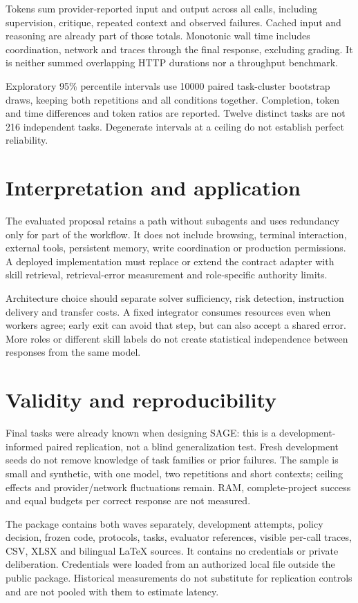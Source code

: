 \documentclass[11pt,a4paper]{article}
\begin{document}
Tokens sum provider-reported input and output across all calls, including
supervision, critique, repeated context and observed failures. Cached input and
reasoning are already part of those totals. Monotonic wall time includes
coordination, network and traces through the final response, excluding grading.
It is neither summed overlapping HTTP durations nor a throughput benchmark.

Exploratory 95\% percentile intervals use 10000 paired task-cluster bootstrap
draws, keeping both repetitions and all conditions together. Completion, token
and time differences and token ratios are reported. Twelve distinct tasks are
not 216 independent tasks. Degenerate intervals at a ceiling do not establish
perfect reliability.


\section{Interpretation and application}

The evaluated proposal retains a path without subagents and uses redundancy only
for part of the workflow. It does not include browsing, terminal interaction,
external tools, persistent memory, write coordination or production permissions.
A deployed implementation must replace or extend the contract adapter with skill
retrieval, retrieval-error measurement and role-specific authority limits.

Architecture choice should separate solver sufficiency, risk detection,
instruction delivery and transfer costs. A fixed integrator consumes resources
even when workers agree; early exit can avoid that step, but can also accept a
shared error. More roles or different skill labels do not create statistical
independence between responses from the same model.

\section{Validity and reproducibility}
Final tasks were already known when designing SAGE: this is a development-informed
paired replication, not a blind generalization test. Fresh development seeds do
not remove knowledge of task families or prior failures. The sample is small and
synthetic, with one model, two repetitions and short contexts; ceiling effects
and provider/network fluctuations remain. RAM, complete-project success and
equal budgets per correct response are not measured.

The package contains both waves separately, development attempts, policy decision,
frozen code, protocols, tasks, evaluator references, visible per-call traces, CSV,
XLSX and bilingual LaTeX sources. It contains no credentials or private deliberation.
Credentials were loaded from an authorized local file outside the public package.
Historical measurements do not substitute for replication controls and are not
pooled with them to estimate latency.



\end{document}
